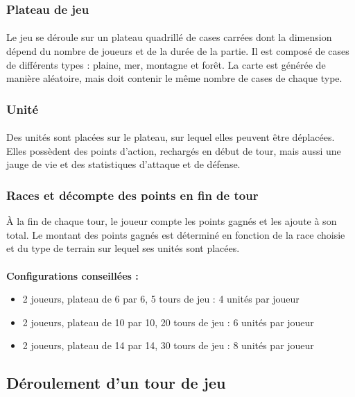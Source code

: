\documentclass[a4paper]{article}
\begin{document}
\subsubsection{Plateau de jeu}
\paragraph{}
Le jeu se déroule sur un plateau quadrillé de cases carrées dont la dimension dépend du nombre de joueurs et de la durée de la partie.\label{map_gen} Il est composé de cases de différents types : plaine, mer, montagne et forêt. La carte est générée de manière aléatoire, mais doit contenir le même nombre de cases de chaque type.

\subsubsection{Unité}
\paragraph{}
Des unités sont placées sur le plateau, sur lequel elles peuvent être déplacées. Elles possèdent des points d'action, rechargés en début de tour, mais aussi une jauge de vie et des statistiques d'attaque et de défense.

\subsubsection{Races et décompte des points en fin de tour}
À la fin de chaque tour, le joueur compte les points gagnés et les ajoute à son total. Le montant des points gagnés est déterminé en fonction de la race choisie et du type de terrain sur lequel ses unités sont placées.

\paragraph{}
\textbf{Configurations conseillées :}
\begin{itemize}
    \item 2 joueurs, plateau de 6 par 6, 5 tours de jeu : 4 unités par joueur
    \item 2 joueurs, plateau de 10 par 10, 20 tours de jeu : 6 unités par joueur
    \item 2 joueurs, plateau de 14 par 14, 30 tours de jeu : 8 unités par joueur
\end{itemize}

\subsection{Déroulement d'un tour de jeu}
\end{document}
